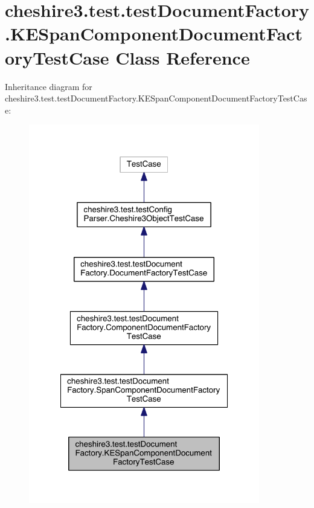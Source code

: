 \hypertarget{classcheshire3_1_1test_1_1test_document_factory_1_1_k_e_span_component_document_factory_test_case}{\section{cheshire3.\-test.\-test\-Document\-Factory.\-K\-E\-Span\-Component\-Document\-Factory\-Test\-Case Class Reference}
\label{classcheshire3_1_1test_1_1test_document_factory_1_1_k_e_span_component_document_factory_test_case}
}


Inheritance diagram for cheshire3.\-test.\-test\-Document\-Factory.\-K\-E\-Span\-Component\-Document\-Factory\-Test\-Case\-:
\nopagebreak
\begin{figure}[H]
\begin{center}
\leavevmode
\includegraphics[width=286pt]{classcheshire3_1_1test_1_1test_document_factory_1_1_k_e_span_component_document_factory_test_case__inherit__graph}
\end{center}
\end{figure}


